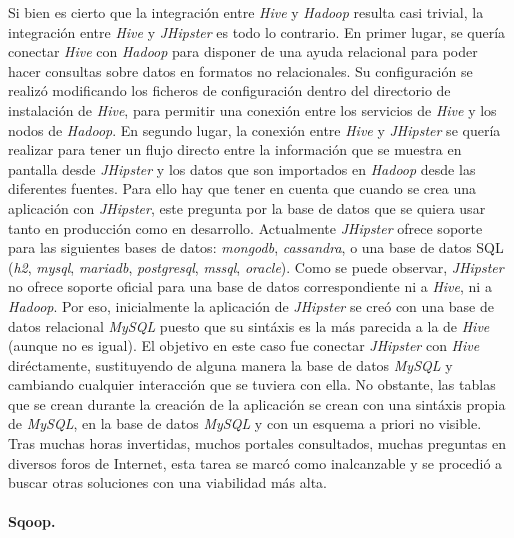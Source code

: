 \par
Si bien es cierto que la integración entre \textit{Hive} y \textit{Hadoop} resulta casi trivial, la integración entre \textit{Hive} y \textit{JHipster} es todo lo contrario. En primer lugar, se quería conectar \textit{Hive} con \textit{Hadoop} para disponer de una ayuda relacional para poder hacer consultas sobre datos en formatos no relacionales. Su configuración se realizó modificando los ficheros de configuración dentro del directorio de instalación de \textit{Hive}, para permitir una conexión entre los servicios de \textit{Hive} y los nodos de \textit{Hadoop}. En segundo lugar, la conexión entre \textit{Hive} y \textit{JHipster} se quería realizar para tener un flujo directo entre la información que se muestra en pantalla desde \textit{JHipster} y los datos que son importados en \textit{Hadoop} desde las diferentes fuentes. Para ello hay que tener en cuenta que cuando se crea una aplicación con \textit{JHipster}, este pregunta por la base de datos que se quiera usar tanto en producción como en desarrollo. Actualmente \textit{JHipster} ofrece soporte para las siguientes bases de datos: \textit{\gls{mongodb}}, \textit{\gls{cassandra}}, o una base de datos SQL (\textit{\gls{h2}}, \textit{\gls{mysql}}, \textit{\gls{mariadb}}, \textit{\gls{postgresql}}, \textit{\gls{mssql}}, \textit{\gls{oracle}}).
Como se puede observar, \textit{JHipster} no ofrece soporte oficial para una base de datos correspondiente ni a \textit{Hive}, ni a \textit{Hadoop}. Por eso, inicialmente la aplicación de \textit{JHipster} se creó con una base de datos relacional \textit{MySQL} puesto que su sintáxis es la más parecida a la de \textit{Hive} (aunque no es igual). El objetivo en este caso fue conectar \textit{JHipster} con \textit{Hive} diréctamente, sustituyendo de alguna manera la base de datos \textit{MySQL} y cambiando cualquier interacción que se tuviera con ella. No obstante, las tablas que se crean durante la creación de la aplicación se crean con una sintáxis propia de \textit{MySQL}, en la base de datos \textit{MySQL} y con un esquema a priori no visible. Tras muchas horas invertidas, muchos portales consultados, muchas preguntas en diversos foros de Internet, esta tarea se marcó como inalcanzable y se procedió a buscar otras soluciones con una viabilidad más alta. 


\bigskip
\par
\paragraph*{Sqoop.}


